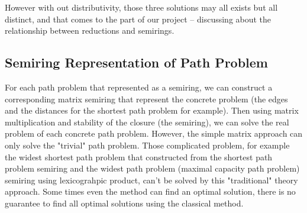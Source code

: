 \documentclass[a4paper,12pt,twoside,openright]{report}
\begin{document}
However with out distributivity, those three solutions may all exists but all distinct, and that comes to the part of our project -- discussing about the relationship between reductions and semirings.

\subsection{Semiring Representation of Path Problem}
For each path problem that represented as a semiring, we can construct a corresponding matrix semiring that represent the concrete problem (the edges and the distances for the shortest path problem for example). Then using matrix multiplication and stability of the closure (the semiring), we can solve the real problem of each concrete path problem. However, the simple matrix approach can only solve the "trivial" path problem. Those complicated problem, for example the widest shortest path problem that constructed from the shortest path problem semiring and the widest path problem (maximal capacity path problem) semiring using lexicograhpic product, can't be solved by this "traditional" theory approach. Some times even the method can find an optimal solution, there is no guarantee to find all optimal solutions using the classical method.
\end{document}
